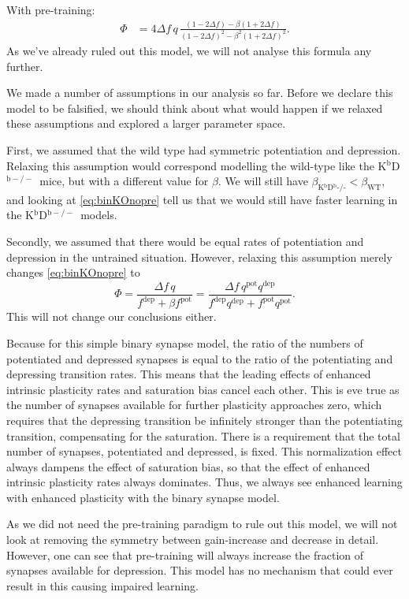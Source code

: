 \documentclass[10pt]{article}
\newcommand{\pot}{^{\text{pot}}}
\newcommand{\dep}{^{\text{dep}}}
\newcommand{\wt}{_{\text{WT}}}
\newcommand{\ko}{_{\text{K$^\mathrm{b}$D$^\mathrm{b}$-/-}}}
\newcommand{\KO}{K$^\mathrm{b}$D$^{\mathrm{b}-/-}$}
\begin{document}
With pre-training:
%
\begin{equation}\label{eq:binKOpre}
\begin{aligned}
  \Phi &= 4{\Delta f}\, q \, \frac{(1-2\Delta f) - \beta(1+2\Delta f)}
          {(1-2\Delta f)^2 - \beta^2(1+2\Delta f)^2}.
\end{aligned}
\end{equation}
%
As we've already ruled out this model, we will not analyse this formula any further.

We made a number of assumptions in our analysis so far.
Before we declare this model to be falsified, we should think about what would happen if we relaxed these assumptions and explored a larger parameter space.

First, we assumed that the wild type had symmetric potentiation and depression.
Relaxing this assumption would correspond modelling the wild-type like the \KO\ mice, but with a different value for $\beta$.
We will still have $\beta\ko<\beta\wt$, and looking at \eqref{eq:binKOnopre} tell us that we would still have faster learning in the \KO\ models.

Secondly, we assumed that there would be equal rates of potentiation and depression in the untrained situation.
However, relaxing this assumption merely changes \eqref{eq:binKOnopre} to
%
\begin{equation}\label{eq:binKOnoprediff}
  \Phi = \frac{{\Delta f}\, q}{f\dep+\beta f\pot} = \frac{{\Delta f}\, q\pot q\dep}{f\dep q\dep+ f\pot q\pot}.
\end{equation}
%
This will not change our conclusions either.

Because for this simple binary synapse model, the ratio of the numbers of potentiated and depressed synapses is equal to the ratio of the potentiating and depressing transition rates.
This means that the leading effects of enhanced intrinsic plasticity rates and saturation bias cancel each other.
This is eve true as the number of synapses available for further plasticity approaches zero, which requires that the depressing transition be infinitely stronger than the potentiating transition, compensating for the saturation.
There is a requirement that the total number of synapses, potentiated and depressed, is fixed.
This normalization effect always dampens the effect of saturation bias, so that the effect of enhanced intrinsic plasticity rates always dominates.
Thus, we always see enhanced learning with enhanced plasticity with the binary synapse model.

As we did not need the pre-training paradigm to rule out this model, we will not look at removing the symmetry between gain-increase and decrease in detail.
However, one can see that pre-training will always increase the fraction of synapses available for depression.
This model has no mechanism that could ever result in this causing impaired learning.
\end{document}
